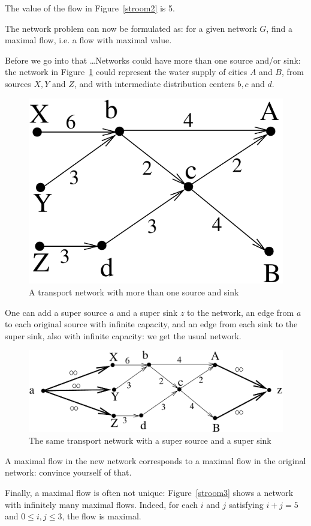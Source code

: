 The value of the flow in Figure~\ref{stroom2} is 5.



The network problem can now be formulated as: for a given network $G$,
find a maximal flow, i.e. a flow with maximal value.


Before we go into that \ldots Networks could have more than one source
and/or sink: the network in Figure~\ref{transport2} could represent
the water supply of cities $A$ and $B$, from sources $X,Y$ and $Z$,
and with intermediate distribution centers $b,c$ and $d$.

\begin{figure}[ht]
\begin{center}
\includegraphics[width=0.22\linewidth,keepaspectratio]{transport2} %
\end{center}
\caption{A transport network with more than one source and sink \label{transport2}}
\end{figure}

One can add a super source $a$ and a super sink $z$ to the network, an
edge from $a$ to each original source with infinite capacity, and an
edge from each sink to the super sink, also with infinite capacity: we
get the usual network.

\begin{figure}[ht]
\begin{center}
\includegraphics[width=0.507\linewidth,keepaspectratio]{transport3} %
\end{center}
\caption{The same transport network with a super source and a
super sink \label{transport3}}
\end{figure}

A maximal flow in the new network corresponds to a maximal flow in the
original network: convince yourself of that.

Finally, a maximal flow is often not unique: Figure~\ref{stroom3}
shows a network with infinitely many maximal flows. Indeed, for each
$i$ and $j$ satisfying $i+j = 5$ and $0 \leq i,j \leq 3$, the flow is
maximal.

